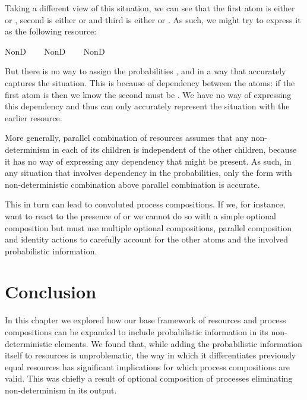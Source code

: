 \documentclass[class=smolathesis,crop=false]{standalone}
\begin{document}
Taking a different view of this situation, we can see that the first atom is either  or , second is either  or  and third is either  or .
As such, we might try to express it as the following resource:
\begin{isabelle}
\centering
  NonD\  \ \ \isasymodot\isanewline
  NonD\  \ \ \isasymodot\isanewline
  NonD\  \ \isaindent{\ \isasymodot}
\end{isabelle}
But there is no way to assign the probabilities ,  and  in a way that accurately captures the situation.
This is because of dependency between the atoms: if the first atom is  then we know the second must be .
We have no way of expressing this dependency and thus can only accurately represent the situation with the earlier resource.

More generally, parallel combination of resources assumes that any non-determinism in each of its children is independent of the other children, because it has no way of expressing any dependency that might be present.
As such, in any situation that involves dependency in the probabilities, only the form with non-deterministic combination above parallel combination is accurate.

This in turn can lead to convoluted process compositions.
If we, for instance, want to react to the presence of  or  we cannot do so with a simple optional composition but must use multiple optional compositions, parallel composition and identity actions to carefully account for the other atoms and the involved probabilistic information.

\section{Conclusion}
\label{sec:prob/conc}

In this chapter we explored how our base framework of resources and process compositions can be expanded to include probabilistic information in its non-deterministic elements.
We found that, while adding the probabilistic information itself to resources is unproblematic, the way in which it differentiates previously equal resources has significant implications for which process compositions are valid.
This was chiefly a result of optional composition of processes eliminating non-determinism in its output.
\end{document}
